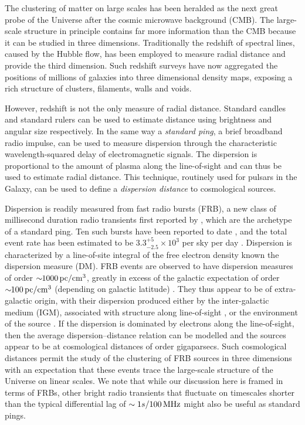\documentclass[twocolumn,prl,floatfix]{revtex4-1}
\begin{document}
The clustering of matter on large scales has been
heralded as the next great probe of the Universe after the cosmic microwave
background (CMB). The large-scale structure in principle contains far more
information than the CMB because it can be studied in three dimensions.
Traditionally the redshift of spectral lines, caused by the Hubble flow, has
been employed to measure radial distance and provide the third dimension.
Such redshift
surveys have now aggregated the positions of millions of galaxies into three
dimensional density maps, exposing a rich structure of clusters, filaments,
walls and voids.

However, redshift is not the only measure of radial distance. Standard
candles and standard rulers can be used to estimate distance using brightness
and angular size respectively.  In the same way a \emph{standard ping}, a brief
broadband radio impulse, can be used to measure dispersion through the
characteristic wavelength-squared delay of electromagnetic signals. The dispersion is
proportional to the amount of plasma along the
line-of-sight and can thus be used to estimate radial distance.
This technique, routinely used for
pulsars in the Galaxy, can be used to define a \emph{dispersion distance} to
cosmological sources.

Dispersion is readily measured from fast radio bursts (FRB),
a new class of millisecond duration radio transients first reported by
\citet{2007Sci...318..777L}, which are the archetype of a standard ping.
Ten such bursts have been reported to date
\citep{2012MNRAS.425L..71K,2013Sci...341...53T, 2014ApJ...790..101S,
2014ApJ...792...19B, 2015MNRAS.447..246P,2015ApJ...799L...5R}, and the total
event rate has been estimated to be $3.3^{+5}_{-2.5} \times 10^3$ per sky per
day \cite{2015arXiv150500834R}.
Dispersion is characterized by a line-of-site
integral of the free electron density known the dispersion measure (DM). FRB
events are observed to have dispersion measures of order $\sim\!\!1000\,{\rm pc}
/ {\rm cm}^3$, greatly in excess of the galactic expectation of order
$\sim\!\!100\,{\rm pc} / {\rm cm}^3$ (depending on galactic latitude)
\cite{2014arXiv1412.4829D}.  They thus appear to be of extra-galactic origin,
with their dispersion produced either by the inter-galactic medium (IGM),
associated with structure along line-of-sight \citep{2013Sci...341...53T},
or the environment of the
source \citep{2014ApJ...785L..26L,2015arXiv150101341P,2015arXiv150505535C}.  If
the dispersion is dominated by electrons along the line-of-sight, then the
average dispersion--distance relation can be modelled
\citep{2014ApJ...797...71Z,2004MNRAS.348..999I, 2003ApJ...598L..79I} and the
sources appear to be at cosmological distances of order gigaparsecs.
Such cosmological distances permit the study of the clustering of FRB sources in
three dimensions with an expectation that these events trace the large-scale
structure of the Universe on linear scales. We note that while our discussion
here is framed in terms of FRBs, other bright radio transients that fluctuate
on timescales shorter than the typical differential lag of $\sim 1s/100 \,{\rm
MHz} $ might also be useful as standard pings.
\end{document}

